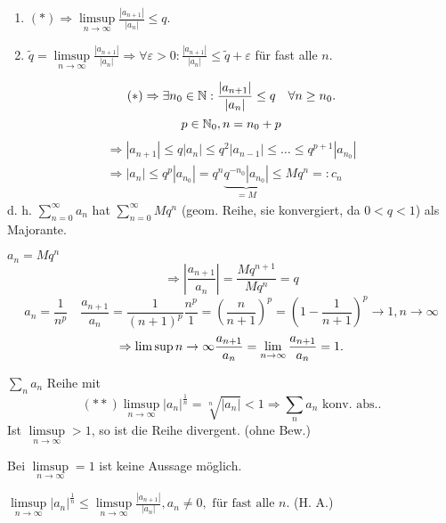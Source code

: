 \begin{bew}
	\begin{enumerate}
		\item \( (*) \Rightarrow \limsup\limits_{n\rightarrow\infty} \frac{|a_{n+1}|}{|a_n|} \leq q. \)
		\item \( \tilde{q} = \limsup\limits_{n\rightarrow\infty} \frac{|a_{n+1}|}{|a_n|} \Rightarrow \forall\varepsilon>0: \frac{|a_{n+1}|}{|a_n|} \leq \tilde{q} + \varepsilon \) für fast alle \(n\).
	\end{enumerate}
	\[ (*)\Rightarrow\exists n_0 \in\mathbb{N}: \frac{|a_{n+1}|}{|a_n|} \leq q \quad\forall n\geq n_0. \]
	\[ p\in\mathbb{N}_0, n=n_0 + p \]
	\begin{align*}
		\Rightarrow |a_{n+1}| \leq q |a_n| \leq q^2|a_{n-1}| \leq \dots\leq q^{p+1}|a_{n_0}|\\
		\Rightarrow |a_n| \leq q^p |a_{n_0}| = q^n \underbrace{q^{-n_0}|a_{n_0}|}_{=M} \leq M q^n =: c_n
	\end{align*}
	d. h. \( \sum_{n=0}^{\infty}a_n \) hat \( \sum_{n=0}^{\infty}M q^n \) (geom. Reihe, sie konvergiert, da \( 0<q<1 \)) als Majorante.
\end{bew}
\begin{bem}
	\( a_n = M q^n \)
	\[ \Rightarrow \left| \frac{a_{n+1}}{a_n} \right| = \frac{M q^{n+1}}{M q^n} = q \]
	\[ a_n = \frac{1}{n^p} \quad \frac{a_{n+1}}{a_n} = \frac{1}{(n+1)^p} \frac{n^p}{1} = \left(\frac{n}{n+1}\right)^p = \left(1 - \frac{1}{n+1}\right)^p \rightarrow 1, n\rightarrow\infty \]
	\[ \Rightarrow \limsup\limits{n\rightarrow\infty} \frac{a_{n+1}}{a_n} = \lim\limits_{n\rightarrow\infty} \frac{a_{n+1}}{a_n} = 1. \]
\end{bem}
\begin{satz}[Wurzelkriterium]
	\( \sum_{n}a_n \) Reihe mit \[ (**) \limsup\limits_{n\rightarrow\infty} |a_n|^{\frac{1}{n}} = \sqrt[n]{|a_n|} < 1 \Rightarrow \sum_n a_n \text{ konv. abs.}.\]
	Ist \( \limsup\limits_{n\rightarrow\infty} > 1 \), so ist die Reihe divergent. (ohne Bew.) 
\end{satz}
\begin{bem}
	Bei \( \limsup\limits_{n\rightarrow\infty} = 1 \) ist keine Aussage möglich.
\end{bem}
\begin{bem}
	\( \limsup\limits_{n\rightarrow\infty} |a_n|^{\frac{1}{n}} \leq \limsup\limits_{n\rightarrow\infty} \frac{|a_{n+1}|}{|a_n|}, a_n \neq 0, \text{ für fast alle } n \). (H. A.)
\end{bem}
